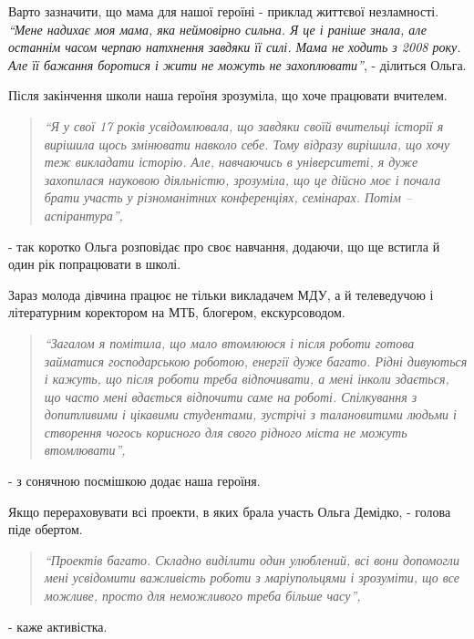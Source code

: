 
Варто зазначити, що мама для нашої героїні - приклад життєвої незламності.
\emph{\enquote{Мене надихає моя мама, яка неймовірно сильна. Я це і раніше знала, але
останнім часом черпаю натхнення завдяки її силі. Мама не ходить з 2008 року.
Але її бажання боротися і жити не можуть не захоплювати}}, - ділиться Ольга. 

Після закінчення школи наша героїня зрозуміла, що хоче працювати вчителем. 

\begin{quote}
\em\enquote{Я у
свої 17 років усвідомлювала, що завдяки своїй вчительці історії я вирішила щось
змінювати навколо себе. Тому відразу вирішила, що хочу теж викладати історію.
Але, навчаючись в університеті, я дуже захопилася науковою діяльністю,
зрозуміла, що це дійсно моє і почала брати участь у різноманітних конференціях,
семінарах. Потім – аспірантура}, 
\end{quote}
- так коротко Ольга розповідає про своє
навчання, додаючи, що ще встигла й один рік попрацювати в школі.

Зараз молода дівчина працює не тільки викладачем МДУ, а й телеведучою і
літературним коректором на МТБ, блогером, екскурсоводом.


\begin{quote}
\em\enquote{Загалом я помітила,
що мало втомлююся і після роботи готова займатися господарською роботою,
енергії дуже багато. Рідні дивуються і кажуть, що після роботи треба
відпочивати, а мені інколи здається, що часто мені вдається відпочити саме на
роботі. Спілкування з допитливими і цікавими студентами, зустрічі з
талановитими людьми і створення чогось корисного для свого рідного міста не
можуть втомлювати}, 
\end{quote}
- з сонячною посмішкою додає наша героїня.

Якщо перераховувати всі проекти, в яких брала участь Ольга Демідко, - голова
піде обертом. 

\begin{quote}
\em\enquote{Проектів багато. Складно виділити один улюблений, всі вони
допомогли мені усвідомити важливість роботи з маріупольцями і зрозуміти, що все
можливе, просто для неможливого треба більше часу},
\end{quote}
- каже активістка.


